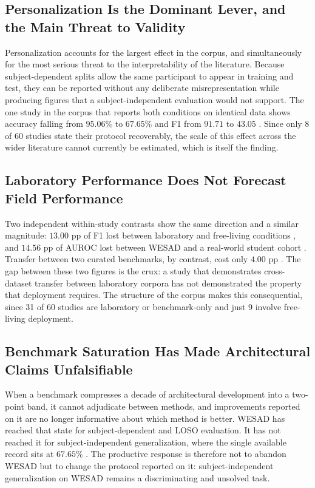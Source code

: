\documentclass[11pt,a4paper]{article}
\begin{document}
\subsection{Personalization Is the Dominant Lever, and the Main Threat to Validity}
Personalization accounts for the largest effect in the corpus, and simultaneously for the
most serious threat to the interpretability of the literature. Because subject-dependent
splits allow the same participant to appear in training and test, they can be reported
without any deliberate misrepresentation while producing figures that a subject-independent
evaluation would not support. The one study in the corpus that reports both conditions on
identical data shows accuracy falling from $95.06\%$ to $67.65\%$ and F1 from $91.71$ to
$43.05$ \cite{r33}. Since only 8 of 60 studies state their protocol recoverably, the scale of
this effect across the wider literature cannot currently be estimated, which is itself the
finding.

\subsection{Laboratory Performance Does Not Forecast Field Performance}
Two independent within-study contrasts show the same direction and a similar magnitude:
$13.00$ pp of F1 lost between laboratory and free-living conditions \cite{r13}, and
$14.56$ pp of AUROC lost between WESAD and a real-world student cohort \cite{r49}. Transfer
between two curated benchmarks, by contrast, cost only $4.00$ pp \cite{r55,r61}. The gap
between these two figures is the crux: a study that demonstrates cross-dataset transfer
between laboratory corpora has not demonstrated the property that deployment requires. The
structure of the corpus makes this consequential, since 31 of 60 studies are laboratory or
benchmark-only and just 9 involve free-living deployment.

\subsection{Benchmark Saturation Has Made Architectural Claims Unfalsifiable}
When a benchmark compresses a decade of architectural development into a two-point band, it
cannot adjudicate between methods, and improvements reported on it are no longer informative
about which method is better. WESAD has reached that state for subject-dependent and LOSO
evaluation. It has not reached it for subject-independent generalization, where the single
available record sits at $67.65\%$ \cite{r33}. The productive response is therefore not to
abandon WESAD but to change the protocol reported on it: subject-independent generalization
on WESAD remains a discriminating and unsolved task.
\end{document}
